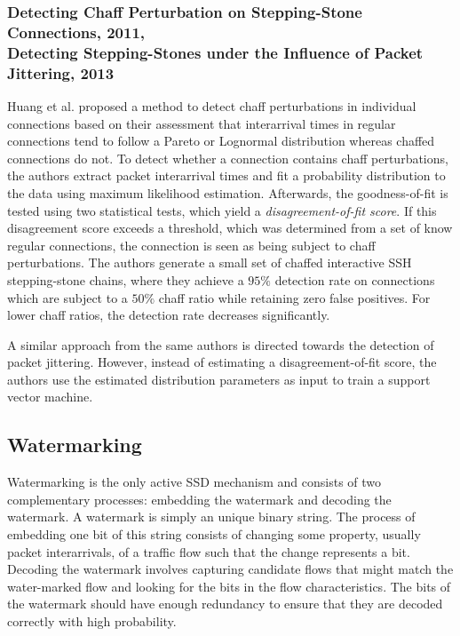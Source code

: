 \documentclass[runningheads]{llncs}\usepackage[]{graphicx}\usepackage[]{color}
\begin{document}
\subsubsection{Detecting Chaff Perturbation on Stepping-Stone Connections, 2011, \\Detecting Stepping-Stones under the  Influence of Packet Jittering, 2013}
Huang et al. \cite{huang2011detecting} proposed a method to detect chaff perturbations in individual connections based on their assessment that interarrival times in regular connections tend to follow a Pareto or Lognormal distribution whereas chaffed connections do not. To detect whether a connection contains chaff perturbations, the authors extract packet interarrival times and fit a probability distribution to the data using maximum likelihood estimation. Afterwards, the goodness-of-fit is tested using two statistical tests, which yield a \textit{disagreement-of-fit score}. If this disagreement score exceeds a threshold, which was determined from a set of know regular connections, the connection is seen as being subject to chaff perturbations. The authors generate a small set of chaffed interactive SSH stepping-stone chains, where they achieve a $95\%$ detection rate on connections which are subject to a $50\%$ chaff ratio while retaining zero false positives. For lower chaff ratios, the detection rate decreases significantly. 

A similar approach from the same authors \cite{ding2013detecting} is directed towards the detection of packet jittering. However, instead of estimating a disagreement-of-fit score, the authors use the estimated distribution parameters as input to train a support vector machine. 

\subsection{Watermarking}

Watermarking is the only active SSD mechanism and consists of two complementary processes: embedding the watermark and decoding the watermark. A watermark is simply an unique binary string. The process of embedding one bit of this string consists of changing some property, usually packet interarrivals, of a traffic flow such that the change represents a bit. Decoding the watermark involves capturing candidate flows that might match the water-marked flow and looking for the bits in the flow characteristics. The bits of the watermark should have enough redundancy to ensure that they are decoded correctly with high probability.
\end{document}
